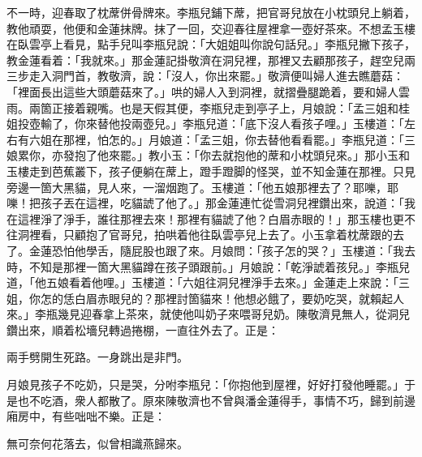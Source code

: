 不一時，迎春取了枕蓆併骨牌來。李瓶兒鋪下蓆，把官哥兒放在小枕頭兒上躺着，教他頑耍，他便和金蓮抹牌。抹了一回，交迎春往屋裡拿一壺好茶來。不想孟玉樓在臥雲亭上看見，點手兒叫李瓶兒說：「大姐姐叫你說句話兒。」李瓶兒撇下孩子，教金蓮看着：{}「我就來。」那金蓮記掛敬濟在洞兒裡，那裡又去顧那孩子，趕空兒兩三步走入洞門首，教敬濟，說：「沒人，你出來罷。」敬濟便叫婦人進去瞧蘑菇：「裡面長出這些大頭蘑菇來了。」哄的婦人入到洞裡，就摺疊腿跪着，要和婦人雲雨。兩箇正接着親嘴。也是天假其便，李瓶兒走到亭子上，月娘說：「孟三姐和桂姐投壺輸了，你來替他投兩壺兒。」李瓶兒道：「底下沒人看孩子哩。」玉樓道：「左右有六姐在那裡，怕怎的。」月娘道：「孟三姐，你去替他看看罷。」{}李瓶兒道：「三娘累你，亦發抱了他來罷。」{}教小玉：「你去就抱他的蓆和小枕頭兒來。」那小玉和玉樓走到芭蕉叢下，孩子便躺在蓆上，蹬手蹬脚的怪哭，並不知金蓮在那裡。只見旁邊一箇大黑貓，見人來，一溜烟跑了。玉樓道：「他五娘那裡去了？耶嚛，耶嚛！把孩子丟在這裡，吃貓諕了他了。」那金蓮連忙從雪洞兒裡鑽出來，說道：「我在這裡淨了淨手，誰往那裡去來！那裡有貓諕了他？白眉赤眼的！」那玉樓也更不往洞裡看，只顧抱了官哥兒，拍哄着他往臥雲亭兒上去了。小玉拿着枕蓆跟的去了。金蓮恐怕他學舌，隨屁股也跟了來。{}月娘問：「孩子怎的哭？」玉樓道：「我去時，不知是那裡一箇大黑貓蹲在孩子頭跟前。」月娘說：「乾淨諕着孩兒。」李瓶兒道，「他五娘看着他哩。」玉樓道：「六姐往洞兒裡淨手去來。」金蓮走上來說：「三姐，你怎的恁白眉赤眼兒的？那裡討箇貓來！他想必餓了，要奶吃哭，就賴起人來。」{}李瓶幾見迎春拿上茶來，就使他叫奶子來喂哥兒奶。陳敬濟見無人，從洞兒鑽出來，順着松墻兒轉過捲棚，一直往外去了。正是：

\begin{myquote}
兩手劈開生死路。一身跳出是非門。
\end{myquote}

月娘見孩子不吃奶，只是哭，分咐李瓶兒：「你抱他到屋裡，好好打發他睡罷。」于是也不吃酒，衆人都散了。原來陳敬濟也不曾與潘金蓮得手，事情不巧，歸到前邊廂房中，有些咄咄不樂。正是：

\begin{myquote}
無可奈何花落去，似曾相識燕歸來。
\end{myquote}

